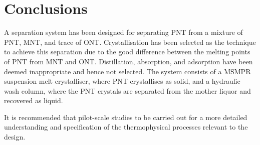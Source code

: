 \section{Conclusions}\label{separation conclusions}

A separation system has been designed for separating PNT from a mixture of PNT, MNT, and trace of ONT. Crystallisation has been selected as the technique to achieve this separation due to the good difference between the melting points of PNT from MNT and ONT. Distillation, absorption, and adsorption have been deemed inappropriate and hence not selected. The system consists of a MSMPR suspension melt crystalliser, where PNT crystallises as solid, and a hydraulic wash column, where the PNT crystals are separated from the mother liquor and recovered as liquid. 

It is recommended that pilot-scale studies to be carried out for a more detailed understanding and specification of the thermophysical processes relevant to the design. 